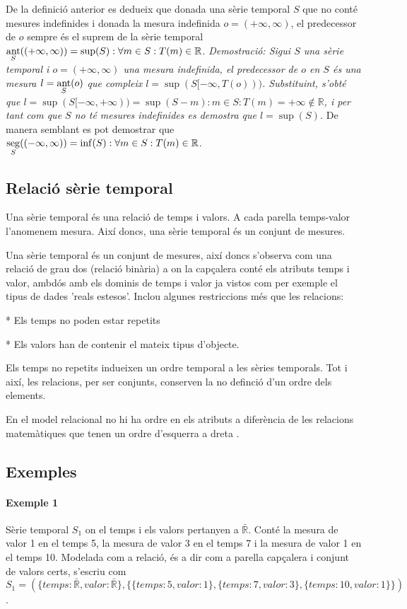 De la definició anterior es dedueix que donada una sèrie temporal $S$
que no conté mesures indefinides i donada la mesura indefinida
$o=(+\infty,\infty)$, el predecessor de $o$ sempre és el suprem de la
sèrie temporal $\operatorname*{ant}\limits_S( (+\infty,\infty) ) = \sup(S): \forall
m\in S: T(m)\in\mathbb{R}$.  %
\emph{Demostració: Sigui $S$ una sèrie temporal i $o=(+\infty,\infty)$
  una mesura indefinida, el predecessor de $o$ en $S$ és una mesura
  $l=\operatorname*{ant}\limits_S(o)$ que compleix
  $l=\sup(S[-\infty,T(o)))$. Substituint, s'obté que
  $l=\sup(S[-\infty,+\infty))=\sup(S-m):m\in S:T(m)=+\infty \notin
  \mathbb{R}$, i per tant com que $S$ no té mesures indefinides es
  demostra que $l=\sup(S)$.  } De manera semblant es pot demostrar que
$\operatorname*{seg}\limits_S( (-\infty,\infty) ) = \inf(S): \forall m\in S:
T(m)\in\mathbb{R}$.




\subsection{Relació sèrie temporal}

Una sèrie temporal és una relació de temps i valors. A cada parella temps-valor l'anomenem mesura. Així doncs, una sèrie temporal és un conjunt de mesures.

Una sèrie temporal és un conjunt de mesures, així doncs s'observa com una relació de grau dos (relació binària)  a on la capçalera conté els atributs temps i valor, ambdós amb els dominis de temps i valor ja vistos com per exemple el tipus de dades 'reals estesos'. Inclou algunes restriccions més que les relacions:

* Els temps no poden estar repetits

* Els valors han de contenir el mateix tipus d'objecte.

Els temps no repetits indueixen un ordre temporal a les sèries temporals. Tot i així, les relacions, per ser conjunts, conserven la no definció d'un ordre dels elements. 


En el model relacional no hi ha ordre en els atributs a diferència de les relacions matemàtiques que tenen un ordre d'esquerra a dreta \parencite[sec.\ 5.3]{date:introduction}.

\subsection{Exemples}

\paragraph{Exemple 1}
Sèrie temporal $S_1$ on el temps i els valors pertanyen a $\bar{\mathbb{R}}$. Conté la mesura de valor 1 en el temps 5, la mesura de valor 3 en el temps 7 i la mesura de valor 1 en el temps 10. Modelada com a relació, és a dir com a parella capçalera i conjunt de valors certs, s'escriu com 
$S_1 = ( \{temps: \bar{\mathbb{R}}, valor: \bar{\mathbb{R}}\}, \{ \{temps:5,valor:1\}, \{temps:7,valor:3\}, \{temps:10,valor:1\} \} )$.

